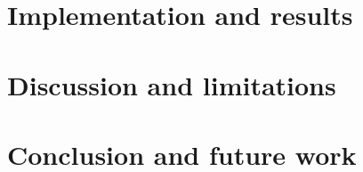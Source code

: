 \chapter{Implementation and results}
\chapter{Discussion and limitations}
\chapter{Conclusion and future work}